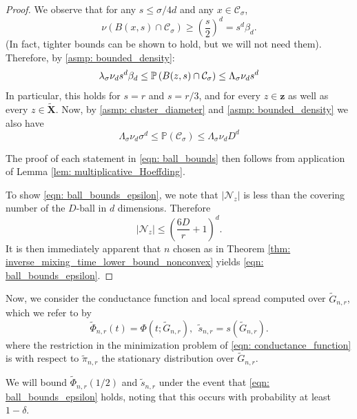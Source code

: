 \documentclass{article}
\newcommand{\abs}[1]{\left \lvert #1 \right \rvert}
\newcommand{\1}{\mathbf{1}}
\newcommand{\zbf}{\mathbf{z}}
\newcommand{\Xbf}{\mathbf{X}}
\newcommand{\Pbb}{\mathbb{P}}
\newcommand{\Cset}{\mathcal{C}}
\newcommand{\Csig}{\Cset_{\sigma}}
\theoremstyle{aldenthm}
\begin{document}
\begin{proof}
	We observe that for any $s \leq \sigma/4d$ and any $x \in \Csig$,
	\begin{equation*}
	\nu(B(x,s) \cap \Csig) \geq \left(\frac{s}{2}\right)^d = s^d \beta_d.
	\end{equation*}
	(In fact, tighter bounds can be shown to hold, but we will not need them). Therefore, by \ref{asmp: bounded_density}:
	\begin{equation*}
	\lambda_{\sigma} \nu_d s^d \beta_d \leq \Pbb\left(B(z,s) \cap \Csig \right) \leq \Lambda_{\sigma} \nu_d s^d \\
	\end{equation*}
	In particular, this holds for $s = r$ and $s = r/3$, and for every $z \in \zbf$ as well as every $z \in \widetilde{\Xbf}$. Now, by \ref{asmp: cluster_diameter} and \ref{asmp: bounded_density} we also have
	\begin{equation*}
	\Lambda_{\sigma} \nu_d \sigma^d \leq \Pbb(\Csig) \leq \Lambda_{\sigma} \nu_d D^d
	\end{equation*}
	
	The proof of each statement in \eqref{eqn: ball_bounds} then follows from application of Lemma \ref{lem: multiplicative_Hoeffding}. 
	
	To show \eqref{eqn: ball_bounds_epsilon}, we note that $\abs{\mathcal{N}_z}$ is less than the covering number of the $D$-ball in $d$ dimensions. Therefore
	\begin{equation*}
	\abs{\mathcal{N}_z} \leq \left(\frac{6D}{r} + 1\right)^d.
	\end{equation*}
	It is then immediately apparent that $n$ chosen as in Theorem \ref{thm: inverse_mixing_time_lower_bound_nonconvex} yields \eqref{eqn: ball_bounds_epsilon}.
\end{proof}

Now, we consider the conductance function and local spread computed over $\widetilde{G}_{n,r}$, which we refer to by
\begin{equation*}
\widetilde{\Phi}_{n,r}(t) = \Phi(t; \widetilde{G}_{n,r}), ~~ \widetilde{s}_{n,r} = s(\widetilde{G}_{n,r}).
\end{equation*}
where the restriction in the minimization problem of \eqref{eqn: conductance_function} is with respect to $\widetilde{\pi}_{n,r}$ the stationary distribution over $\widetilde{G}_{n,r}$.

We will bound $\widetilde{\Phi}_{n,r}(1/2)$ and $\widetilde{s}_{n,r}$ under the event that \eqref{eqn: ball_bounds_epsilon} holds, noting that this occurs with probability at least $1 - \delta$.
\end{document}
